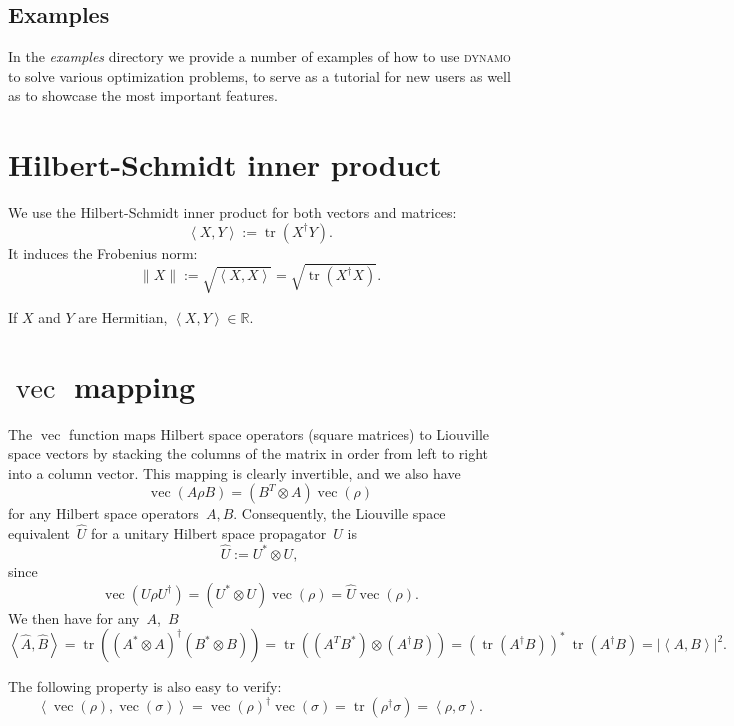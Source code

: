\documentclass[aps, pra, a4paper, longbibliography, superscriptaddress]{revtex4-1}
\newcommand{\be}{\begin{equation}}
\newcommand{\ee}{\end{equation}}
\newcommand{\R}{{\mathbb R}}  %
\newcommand{\inprod}[2]{\left\langle #1, #2 \right\rangle}
\DeclareMathOperator{\tr}{tr}
\DeclareMathOperator{\cvec}{vec}
\newcommand{\vecop}[1]{\widehat{#1}}
\newcommand{\DYNAMO}{\textsc{dynamo}}
\begin{document}
\subsection{Examples}
In the \emph{examples} directory we provide a number of examples of
how to use \DYNAMO{} to solve various optimization problems, to
serve as a tutorial for new users as well as to showcase the most important features.



\appendix
\section{Hilbert-Schmidt inner product}
\label{sec:hs}

We use the Hilbert-Schmidt inner product for both vectors and matrices:
\be
\inprod{X}{Y} := \tr\left(X^\dagger Y\right).
\ee
It induces the Frobenius norm:
\be
\|X\| := \sqrt{\inprod{X}{X}} = \sqrt{\tr\left(X^\dagger X\right)}.
\ee

If $X$ and $Y$ are Hermitian, $\inprod{X}{Y} \in \R$.

\section{$\cvec$ mapping}
\label{sec:vec}

The $\cvec$ function maps Hilbert space operators (square matrices) to
Liouville space vectors by stacking the columns of the matrix in order
from left to right into a column vector. This mapping is clearly
invertible, and we also have
\be
\cvec(A \rho B) = (B^T \otimes A) \cvec(\rho)
\ee
for any Hilbert space operators~$A, B$.
Consequently, the Liouville space equivalent~$\vecop{U}$ for a unitary Hilbert space
propagator~$U$ is
\be
\label{eq:L-unitary}
\vecop{U} := U^* \otimes U,
\ee
since
\be
\cvec(U \rho U^\dagger) = (U^* \otimes U) \cvec(\rho) = \vecop{U} \cvec(\rho).
\ee
We then have for any~$A$,~$B$
\be
\label{eq:hat-product}
\inprod{\vecop{A}}{\vecop{B}}
= \tr((A^* \otimes A)^\dagger (B^* \otimes B))
= \tr((A^T B^*) \otimes (A^\dagger B))
= (\tr(A^\dagger B))^* \: \tr(A^\dagger B)
= |\inprod{A}{B}|^2.
\ee

The following property is also easy to verify:
\be
\inprod{\cvec(\rho)}{\cvec(\sigma)} = \cvec(\rho)^\dagger \cvec(\sigma)
= \tr(\rho^\dagger \sigma) = \inprod{\rho}{\sigma}.
\ee






\end{document}
